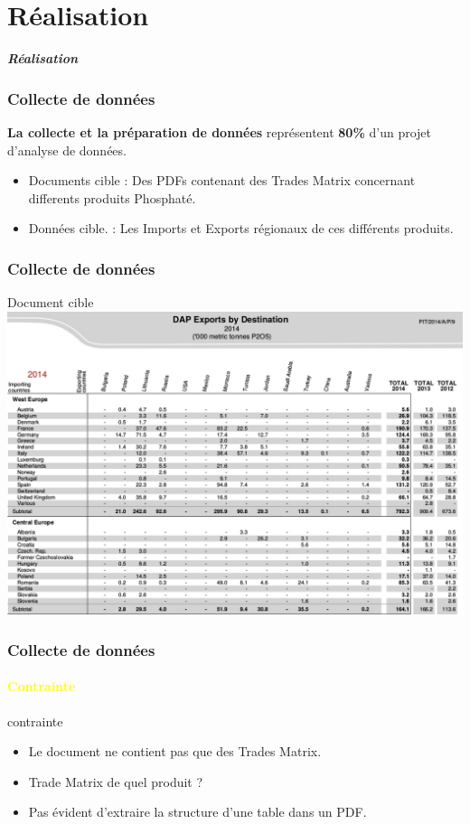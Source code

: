 \documentclass{beamer}
\begin{document}
\section{Réalisation}

\begin{frame}
	\begin{center}
		\Huge \textbf{\textit{Réalisation}}
	\end{center}
\end{frame}

\begin{frame}
  \frametitle{Collecte de données}
  \textbf{La collecte et la préparation de données} représentent \textbf{80\%} d'un projet d'analyse de données.\\
  \begin{itemize}
    \item Documents cible : Des PDFs contenant des Trades Matrix concernant differents produits Phosphaté.
    \item Données cible. : Les Imports et Exports régionaux de ces différents produits.
  \end{itemize}
\end{frame}

\begin{frame}
  \frametitle{Collecte de données}
	\begin{block}{Document cible}
    		\includegraphics[width=\textwidth, height=0.8\textheight, keepaspectratio]{DocIFA}
	\end{block}
\end{frame}

\begin{frame}
  \frametitle{Collecte de données}
  \framesubtitle{\textbf{\textcolor{yellow}{Contrainte}}}
  \begin{block}{contrainte}
  	\begin{itemize}
    		\item Le document ne contient pas que des Trades Matrix.
    		\item Trade Matrix de quel produit ?
    		\item Pas évident d'extraire la structure d'une table dans un PDF.
  	\end{itemize}
  \end{block}
\end{frame}
\end{document}
